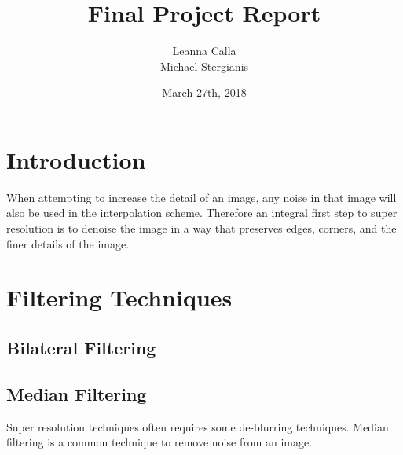 \documentclass{article}
\title{Final Project Report}
\author{Leanna Calla \\ Michael Stergianis}
\date{March 27th, 2018}
\begin{document}
\maketitle
%
\section{Introduction}
\begin{flushleft}
  When attempting to increase the detail of an image, any noise in
  that image will also be used in the interpolation scheme. Therefore
  an integral first step to super resolution is to denoise the image
  in a way that preserves edges, corners, and the finer details of the
  image.
\end{flushleft}
%
\section{Filtering Techniques}
\subsection{Bilateral Filtering}
\subsection{Median Filtering}
Super resolution techniques often requires some de-blurring
techniques. Median filtering is a common technique to remove noise
from an image. 
%
\end{document}
